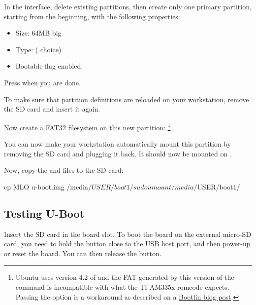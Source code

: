 In the  interface, delete existing partitions, then
create only one primary partition, starting from the beginning, with the
following properties:

\begin{itemize}
\item Size: 64MB big
\item Type:  ( choice)
\item Bootable flag enabled
\end{itemize}

Press  when you are done.

To make sure that partition definitions are reloaded on your
workstation, remove the SD card and insert it again.

Now create a FAT32 filesystem on this new partition:
\footnote{Ubuntu uses version 4.2 of  and the FAT
generated by this version of the command is incompatible with what
the TI AM335x romcode expects. Passing the  option
is a workaround as described on a
\href{https://bootlin.com/blog/workaround-for-creating-bootable-fat-partition-for-beagle-bone-am335x-on-recent-distros/}
{Bootlin blog post}.}

You can now make your workstation automatically mount this
partition by removing the SD card and plugging it back. It should
now be mounted on .

Now, copy the  and  files to the SD card:
\begin{bashinput}
cp MLO u-boot.img /media/$USER/boot1/
sudo umount /media/$USER/boot1/
\end{bashinput}

\subsection{Testing U-Boot}

Insert the SD card in the board slot. To boot the board on the external micro-SD
card, you need to hold the  button close to the USB host
port, and then power-up or reset the board. You can then release the
 button.

